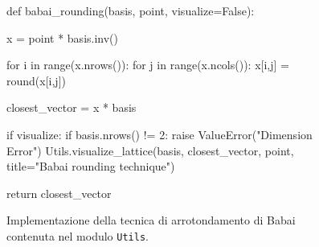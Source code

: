 \begin{figure}[h]
    \begin{python}
        def babai_rounding(basis, point, visualize=False):

            x = point * basis.inv()

            for i in range(x.nrows()):
                for j in range(x.ncols()):
                    x[i,j] = round(x[i,j])
            
            closest_vector = x * basis  

            if visualize:
                if basis.nrows() != 2:
                    raise ValueError("Dimension Error")
                Utils.visualize_lattice(basis, closest_vector, 
                    point, title="Babai rounding technique")
                
            return closest_vector
    \end{python}
    \caption{Implementazione della tecnica di arrotondamento di Babai contenuta nel modulo 
    \texttt{Utils}.}
    \label{fig:utilsbabai}
\end{figure}

